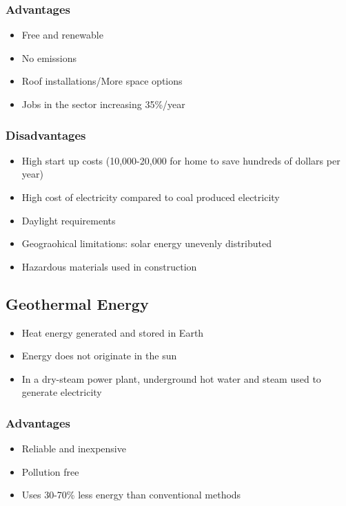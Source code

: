 \documentclass[11pt]{article}
\begin{document}
\subsubsection{Advantages}
\label{sec:orga144a7b}
\begin{itemize}
\item Free and renewable
\item No emissions
\item Roof installations/More space options
\item Jobs in the sector increasing 35\%/year
\end{itemize}
\subsubsection{Disadvantages}
\label{sec:orgc888353}
\begin{itemize}
\item High start up costs (10,000-20,000 for home to save hundreds of dollars per year)
\item High cost of electricity compared to coal produced electricity
\item Daylight requirements
\item Geograohical limitations: solar energy unevenly distributed
\item Hazardous materials used in construction
\end{itemize}
\subsection{Geothermal Energy}
\label{sec:orgc7dc851}
\begin{itemize}
\item Heat energy generated and stored in Earth
\item Energy does not originate in the sun
\item In a dry-steam power plant, underground hot water and steam used to generate electricity
\end{itemize}
\subsubsection{Advantages}
\label{sec:org7cbd9b4}
\begin{itemize}
\item Reliable and inexpensive
\item Pollution free
\item Uses 30-70\% less energy than conventional methods
\end{itemize}
\end{document}
